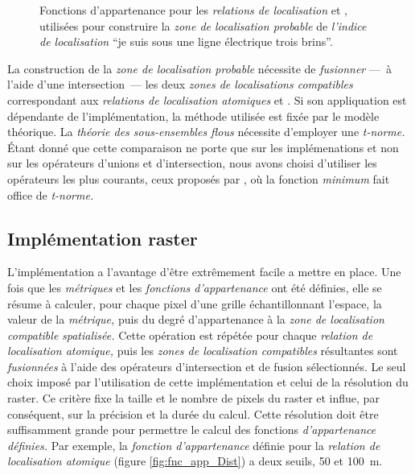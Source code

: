 \begin{figure}
  \centering
  \subfloat{%
    
    \label{fig:fnc_app_Dist}
  }
  \hfill%
  \subfloat{%
    
    \label{fig:fnc_app_AltInf}
  }
  \caption{Fonctions d'appartenance pour les \emph{relations de
      localisation}
    \protect{}
    et
    \protect{},
    utilisées pour construire la \emph{zone de localisation probable}
    de \emph{l'indice de localisation} \enquote{je suis sous une ligne
      électrique trois brins}.}
  \label{fig:fnc_app_sousProche}
\end{figure}

La construction de la \emph{zone de localisation probable} nécessite
de \emph{fusionner} ---~à l'aide d'une intersection~--- les deux
\emph{zones de localisations compatibles} correspondant aux
\emph{relations de localisation atomiques}
 et
. Si
son appliquation est dépendante de l'implémentation, la méthode
utilisée est fixée par le modèle théorique. La \emph{théorie des
  sous-ensembles flous} nécessite d'employer une \emph{t-norme.} Étant
donné que cette comparaison ne porte que sur les implémenations et non
sur les opérateurs d'unions et d'intersection, nous avons choisi
d'utiliser les opérateurs les plus courants, ceux proposés par
\textcite{Zadeh1965}, où la fonction \emph{minimum} fait office de
\emph{t-norme.}

\subsection{Implémentation raster}

L'implémentation a l'avantage d'être extrêmement facile a mettre en
place. Une fois que les \emph{métriques} et les \emph{fonctions
  d’appartenance} ont été définies, elle se résume à calculer, pour
chaque pixel d'une grille échantillonnant l'espace, la valeur de la
\emph{métrique,} puis du degré d'appartenance à la \emph{zone de
  localisation compatible} \emph{spatialisée.} Cette opération est
répétée pour chaque \emph{relation de localisation atomique,} puis les
\emph{zones de localisation compatibles} résultantes sont
\emph{fusionnées} à l'aide des opérateurs d'intersection et de fusion
sélectionnés. Le seul choix imposé par l'utilisation de cette
implémentation et celui de la résolution du raster. Ce critère fixe la
taille et le nombre de pixels du raster et influe, par conséquent, sur
la précision et la durée du calcul. Cette résolution doit être
suffisamment grande pour permettre le calcul des fonctions
\emph{d'appartenance définies.} Par exemple, la \emph{fonction
  d'appartenance} définie pour la \emph{relation de localisation
  atomique}
(figure \ref{fig:fnc_app_Dist}) a deux seuils, \num{50} et
\SI{100}{\meter}.

